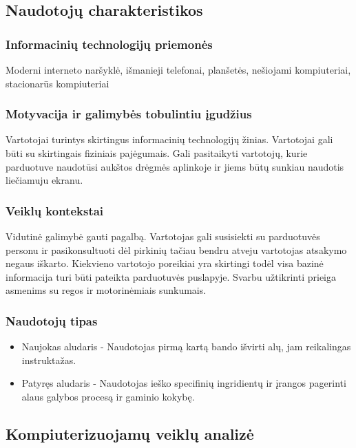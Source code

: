 \documentclass[oneside]{VUMIFPSkursinis}
\begin{document}
	\subsection{Naudotojų charakteristikos}
		\subsubsection{Informacinių technologijų priemonės} 
			Moderni interneto naršyklė, išmanieji telefonai, planšetės, nešiojami kompiuteriai, stacionarūs kompiuteriai 
		\subsubsection{Motyvacija ir galimybės tobulintiu įgudžius}
			 Vartotojai turintys skirtingus informacinių technologijų žinias. Vartotojai gali būti su skirtingais fiziniais pajėgumais.
			Gali pasitaikyti vartotojų, kurie parduotuve naudotūsi aukštos drėgmės aplinkoje ir jiems būtų sunkiau naudotis liečiamuju ekranu. 
		\subsubsection{Veiklų kontekstai}
			Vidutinė galimybė gauti pagalbą.
			Vartotojas gali susisiekti su parduotuvės personu ir pasikonsultuoti dėl pirkinių tačiau bendru atveju vartotojas atsakymo negaus iškarto.
			Kiekvieno vartotojo poreikiai yra skirtingi todėl visa bazinė informacija turi būti pateikta parduotuvės puslapyje.
			Svarbu užtikrinti prieiga asmenims su regos ir motorinėmiais sunkumais.
		\subsubsection{Naudotojų tipas}
			\begin{itemize}
				\item{Naujokas aludaris - Naudotojas pirmą kartą bando išvirti alų, jam reikalingas instruktažas.}
				\item{Patyręs aludaris - Naudotojas ieško specifinių ingridientų ir įrangos pagerinti alaus galybos procesą ir gaminio kokybę.}
			\end{itemize}
	\subsection{Kompiuterizuojamų veiklų analizė}
\end{document}
